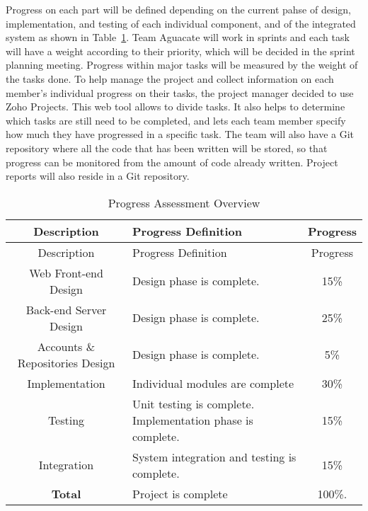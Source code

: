 
Progress on each part will be defined depending on the current pahse of design, implementation, and testing of each individual component, and of the integrated system as shown in Table~\ref{asses}. Team Aguacate will work in sprints and each task
will have a weight according to their priority, which will be decided in the
sprint planning meeting. Progress within major tasks will be measured by the weight of
the tasks done. To help manage the project and collect information on each member's individual
progress on their tasks, the project manager decided to use Zoho Projects. This
web tool allows to divide tasks. It also helps to determine which tasks are
still need to be completed, and lets each team member specify how much they have
progressed in a specific task. The team will also have a Git repository where
all the code that has been written will be stored, so that progress can be
monitored from the amount of code already written. Project reports will also
reside in a Git repository.

\begin{center}
\setlength{\extrarowheight}{1.5pt}
  \begin{longtable}{|c|m{7.5cm}|c|}
 \caption{Progress Assessment Overview \label{asses}} \\
   \hline
  
  \centering Description & Progress Definition & Progress \\
  \hline \hline \endfirsthead
  
     \hline

	\centering Description & Progress Definition & Progress \\
  \hline \hline \endhead
  
  \endfoot  
  
  Web Front-end Design & Design phase is complete. & 15\%\\ \hline   
  Back-end Server Design & Design phase is complete. & 25\%\\ \hline   
  Accounts \& Repositories Design & Design phase is complete. & 5\%\\ \hline 
  Implementation & Individual modules are complete & 30\%\\ \hline 
  Testing & Unit testing is complete. Implementation phase is complete. & 15\%\\ \hline
  Integration & System integration and testing is complete. & 15\%\\ \hline
  \textbf{Total} & Project is complete & 100\%. \\ \hline   
  \end{longtable} \end{center}